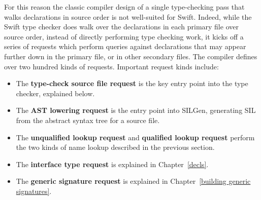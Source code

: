 \documentclass[a4paper,headsepline,bibliography=totoc,toc=flat,fleqn,twoside=semi]{scrbook}
\theoremstyle{definition}
\theoremstyle{definition}
\theoremstyle{definition}
\begin{document}
For this reason the classic compiler design of a single type-checking pass that walks declarations in source order is not well-suited for Swift. Indeed, while the Swift type checker does walk over the declarations in each primary file over source order, instead of directly performing type checking work, it kicks off a series of requests which perform queries against declarations that may appear further down in the primary file, or in other secondary files. The compiler defines over two hundred kinds of requests. Important request kinds include:
\begin{itemize}
\item The \textbf{type-check source file request} is the key entry point into the type checker, explained below.
\item The \textbf{AST lowering request} is the entry point into SILGen, generating SIL from the abstract syntax tree for a source file.
\item The \textbf{unqualified lookup request} and \textbf{qualified lookup request} perform the two kinds of name lookup described in the previous section.
\item The \textbf{interface type request} is explained in Chapter~\ref{decls}.
\item The \textbf{generic signature request} is explained in Chapter~\ref{building generic signatures}.
\end{itemize}
\end{document}
